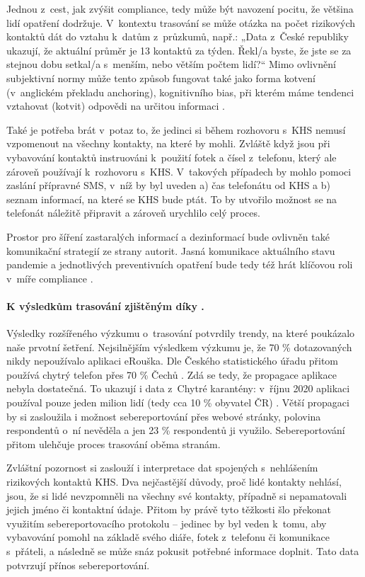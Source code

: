 Jednou z~cest, jak zvýšit compliance, tedy může být navození pocitu, že většina lidí opatření dodržuje. V~kontextu trasování se může otázka na počet rizikových kontaktů dát do vztahu k~datům z~průzkumů, např.: „Data z~České republiky ukazují, že aktuální průměr je 13 kontaktů za týden. Řekl/a byste, že jste se za stejnou dobu setkal/a s~menším, nebo větším počtem lidí?“ Mimo ovlivnění subjektivní normy může tento způsob fungovat také jako forma kotvení (v~anglickém překladu anchoring), kognitivního bias, při kterém máme tendenci vztahovat (kotvit) odpovědi na určitou informaci \cite{Tversky1974}.

Také je potřeba brát v~potaz to, že jedinci si během rozhovoru s~KHS nemusí vzpomenout na všechny kontakty, na které by mohli. Zvláště když jsou při vybavování kontaktů instruováni k~použití fotek a čísel z~telefonu, který ale zároveň používají k~rozhovoru s~KHS. V~takových případech by mohlo pomoci zaslání pří\-prav\-né SMS, v~níž by byl uveden a) čas telefonátu od KHS a b) seznam informací, na které se KHS bude ptát. To by utvořilo možnost se na telefonát náležitě připravit a zároveň urychlilo celý proces.

Prostor pro šíření zastaralých informací a dezinformací bude ovlivněn také komunikační strategií ze strany autorit. Jasná komunikace aktuálního stavu pandemie a jednotlivých preventivních opatření bude tedy též hrát klíčovou roli v~míře compliance \cite{Hyland-Wood2021}. 

\paragraph*{K výsledkům trasování zjištěným díky .} Vý\-sled\-ky roz\-ší\-ře\-né\-ho výzkumu o~trasování potvrdily trendy, na které poukázalo naše prvotní šetření. Nejsilnějším výsledkem výzkumu je, že 70 \% dotazovaných nikdy nepoužívalo aplikaci eRouška. Dle Českého statistického úřadu přitom používá chytrý telefon přes 70 \% Čechů \cite{Mana2020}. Zdá se tedy, že propagace aplikace nebyla dostatečná. To ukazují i data z~Chytré karantény: v~říjnu 2020 aplikaci používal pouze jeden milion lidí (tedy cca 10 \% obyvatel ČR) \cite{Fiser2020}. Větší propagaci by si zasloužila i možnost sebereportování přes webové stránky, polovina respondentů o~ní nevěděla a jen 23 \% respondentů ji využilo. Sebereportování přitom ulehčuje proces trasování oběma stranám. 

Zvláštní pozornost si zaslouží i interpretace dat spojených s~nehlášením rizikových kontaktů KHS. Dva nejčastější důvody, proč lidé kontakty nehlásí, jsou, že si lidé nevzpomněli na všechny své kontakty, případně si nepamatovali jejich jméno či kontaktní údaje. Přitom by právě tyto těžkosti šlo překonat využitím sebereportovacího protokolu -- jedinec by byl veden k~tomu, aby vybavování pomohl na základě svého diáře, fotek z~telefonu či komunikace s~přáteli, a následně se může snáz pokusit potřebné informace doplnit. Tato data potvrzují přínos sebereportování.

